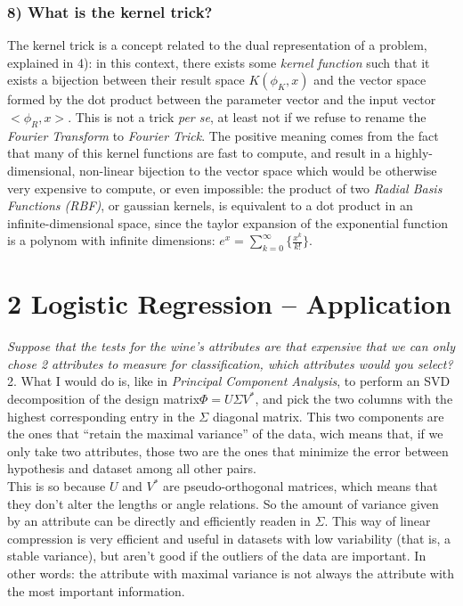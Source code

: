 \documentclass[11pt]{scrartcl} %
\begin{document}
         \subsubsection*{8) What is the kernel trick?}
         The kernel trick is a concept related to the dual representation of a problem, explained in 4): in this context, there exists some {\it kernel function} such that it exists a bijection between their result space \(K(\phi_K, x)\) and the vector space formed by the dot product between the parameter vector and the input vector \(<\phi_R, x>\). This is not a trick {\it per se}, at least not if we refuse to rename the {\it Fourier Transform} to {\it Fourier Trick}. The positive meaning comes from the fact that many of this kernel functions are fast to compute, and result in a highly-dimensional, non-linear bijection to the vector space which would be otherwise very expensive to compute, or even impossible: the product of two {\it Radial Basis Functions (RBF)}, or gaussian kernels, is equivalent to a dot product in an infinite-dimensional space, since the taylor expansion of the exponential function is a polynom with infinite dimensions: \(e^x = \sum_{k=0}^\infty\{\frac{x^k}{k!}\}\).
         \vspace{-2mm}
             \section*{2 Logistic Regression -- Application}
                      {\it Suppose that the tests for the wine’s attributes are that expensive that we can only chose
                        2 attributes to measure for classification, which attributes would you select?}\\
                      
                      2. What I would do is, like in {\it Principal Component Analysis}, to perform an SVD decomposition of the design matrix\(\Phi = U\Sigma V^*\), and pick the two columns with the highest corresponding entry in the \(\Sigma\) diagonal matrix. This two components are the ones that ``retain the maximal variance'' of the data, wich means that, if we only take two attributes, those two are the ones that minimize the error between hypothesis and dataset among all other pairs.\\
                      This is so because \(U\) and \(V^*\) are pseudo-orthogonal matrices, which means that they don't alter the lengths or angle relations. So the amount of variance given by an attribute can be directly and efficiently readen in \(\Sigma\). This way of linear compression is very efficient and useful in datasets with low variability (that is, a stable variance), but aren't good if the outliers of the data are important. In other words: the attribute with maximal variance is not always the attribute with the most important information.
\end{document}
